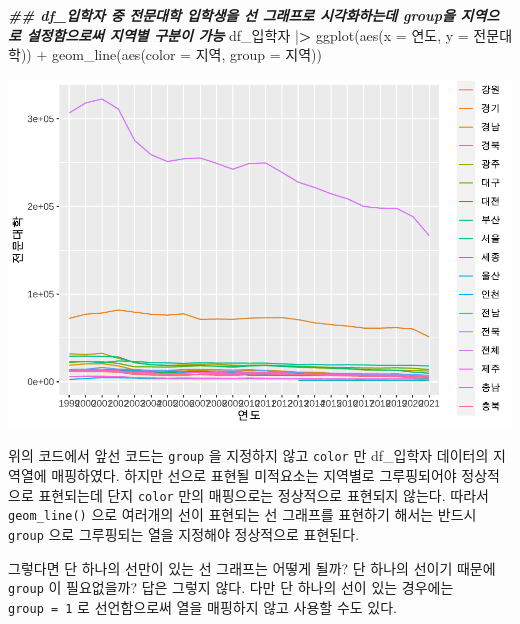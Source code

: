 \documentclass[
]{article}
\newenvironment{Shaded}{\begin{snugshade}}{\end{snugshade}}
\newcommand{\AttributeTok}[1]{\textcolor[rgb]{0.77,0.63,0.00}{#1}}
\newcommand{\DocumentationTok}[1]{\textcolor[rgb]{0.56,0.35,0.01}{\textbf{\textit{#1}}}}
\newcommand{\ErrorTok}[1]{\textcolor[rgb]{0.64,0.00,0.00}{\textbf{#1}}}
\newcommand{\FunctionTok}[1]{\textcolor[rgb]{0.00,0.00,0.00}{#1}}
\newcommand{\NormalTok}[1]{#1}
\newcommand{\SpecialCharTok}[1]{\textcolor[rgb]{0.00,0.00,0.00}{#1}}
\begin{document}
\begin{Shaded}
\begin{Highlighting}[]
\DocumentationTok{\#\# df\_입학자 중 전문대학 입학생을 선 그래프로 시각화하는데 group을 지역으로 설정함으로써 지역별 구분이 가능}
\NormalTok{df\_입학자 }\SpecialCharTok{|}\ErrorTok{\textgreater{}}
  \FunctionTok{ggplot}\NormalTok{(}\FunctionTok{aes}\NormalTok{(}\AttributeTok{x =}\NormalTok{ 연도, }\AttributeTok{y =}\NormalTok{ 전문대학)) }\SpecialCharTok{+}
  \FunctionTok{geom\_line}\NormalTok{(}\FunctionTok{aes}\NormalTok{(}\AttributeTok{color =}\NormalTok{ 지역, }\AttributeTok{group =}\NormalTok{ 지역))}
\end{Highlighting}
\end{Shaded}

\includegraphics{chap3_files/figure-latex/unnamed-chunk-17-2.pdf}

위의 코드에서 앞선 코드는 \texttt{group} 을 지정하지 않고 \texttt{color} 만 df\_입학자 데이터의 지역열에 매핑하였다. 하지만 선으로 표현될 미적요소는 지역별로 그루핑되어야 정상적으로 표현되는데 단지 \texttt{color} 만의 매핑으로는 정상적으로 표현되지 않는다. 따라서 \texttt{geom\_line()} 으로 여러개의 선이 표현되는 선 그래프를 표현하기 해서는 반드시 \texttt{group} 으로 그루핑되는 열을 지정해야 정상적으로 표현된다.

그렇다면 단 하나의 선만이 있는 선 그래프는 어떻게 될까? 단 하나의 선이기 때문에 \texttt{group} 이 필요없을까? 답은 그렇지 않다. 다만 단 하나의 선이 있는 경우에는 \texttt{group\ =\ 1} 로 선언함으로써 열을 매핑하지 않고 사용할 수도 있다.
\end{document}
